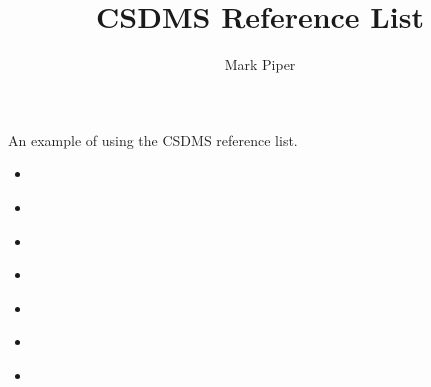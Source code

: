 \documentclass[11pt]{article}
\begin{document}
\title{CSDMS Reference List}
\author{Mark Piper}
\maketitle

An example of using the CSDMS reference list.

\begin{itemize}
\item \cite{tucker:2010}
\item \cite{overeem:2015a}
\item \cite{kettner:2008}
\item \cite{hutton:2008}
\item \cite{piper:2015}
\item \cite{blanca:2017}
\item \cite{jupyter:2015}
\end{itemize}


\end{document}
